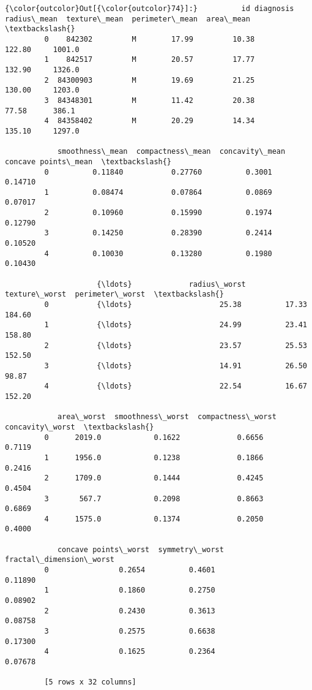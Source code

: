 \documentclass[11pt]{article}
\begin{document}
\begin{Verbatim}[commandchars=\\\{\}]
{\color{outcolor}Out[{\color{outcolor}74}]:}          id diagnosis  radius\_mean  texture\_mean  perimeter\_mean  area\_mean  \textbackslash{}
         0    842302         M        17.99         10.38          122.80     1001.0   
         1    842517         M        20.57         17.77          132.90     1326.0   
         2  84300903         M        19.69         21.25          130.00     1203.0   
         3  84348301         M        11.42         20.38           77.58      386.1   
         4  84358402         M        20.29         14.34          135.10     1297.0   
         
            smoothness\_mean  compactness\_mean  concavity\_mean  concave points\_mean  \textbackslash{}
         0          0.11840           0.27760          0.3001              0.14710   
         1          0.08474           0.07864          0.0869              0.07017   
         2          0.10960           0.15990          0.1974              0.12790   
         3          0.14250           0.28390          0.2414              0.10520   
         4          0.10030           0.13280          0.1980              0.10430   
         
                     {\ldots}             radius\_worst  texture\_worst  perimeter\_worst  \textbackslash{}
         0           {\ldots}                    25.38          17.33           184.60   
         1           {\ldots}                    24.99          23.41           158.80   
         2           {\ldots}                    23.57          25.53           152.50   
         3           {\ldots}                    14.91          26.50            98.87   
         4           {\ldots}                    22.54          16.67           152.20   
         
            area\_worst  smoothness\_worst  compactness\_worst  concavity\_worst  \textbackslash{}
         0      2019.0            0.1622             0.6656           0.7119   
         1      1956.0            0.1238             0.1866           0.2416   
         2      1709.0            0.1444             0.4245           0.4504   
         3       567.7            0.2098             0.8663           0.6869   
         4      1575.0            0.1374             0.2050           0.4000   
         
            concave points\_worst  symmetry\_worst  fractal\_dimension\_worst  
         0                0.2654          0.4601                  0.11890  
         1                0.1860          0.2750                  0.08902  
         2                0.2430          0.3613                  0.08758  
         3                0.2575          0.6638                  0.17300  
         4                0.1625          0.2364                  0.07678  
         
         [5 rows x 32 columns]
\end{Verbatim}
            
\end{document}
